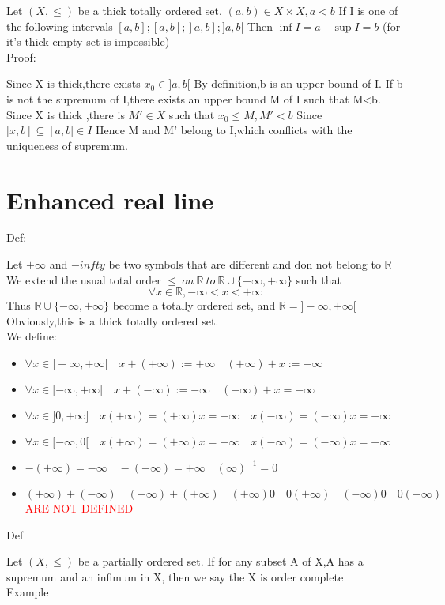 \documentclass{book}
\begin{document}
Let $(X,\leq)$ be a thick totally ordered set. $(a,b)\in X\times X,a<b$ If I is one of the following intervals $[a,b];[a,b[;]a,b];]a,b[$ Then $\inf I=a\quad \sup I=b$ (for it's thick empty set is impossible)\\
Proof:

Since X is thick,there exists $x_0\in]a,b[$ By definition,b is an upper bound of I. If b is not the supremum of I,there exists an upper bound M of I such that M<b. Since X is thick ,there is $M'\in X$ such that $x_0\leq M,M'<b$ Since $[x,b[\subseteq]a,b[\in I$ Hence M and M' belong to I,which conflicts with the uniqueness of supremum.
\chapter{Enhanced real line}
Def:

Let $+\infty$ and $-infty$ be two symbols that are different and don not belong to $\mathbb{R}$ We extend the usual total order $\leq\ on\ \mathbb{R}\ to\ \mathbb{R}\cup\{-\infty,+\infty\}$ such that $$\forall x\in \mathbb{R} ,-\infty<x<+\infty$$ 
\indent Thus $\mathbb{R} \cup\{-\infty,+\infty\}$ become a totally ordered set, and $\mathbb{R} =]-\infty,+\infty[$  Obviously,this is a thick totally ordered set.\\
We define:
\begin{itemize}
    \item $\forall x\in ]-\infty,+\infty]\quad x+(+\infty):=+\infty \quad (+\infty)+x:=+\infty$
    \item $\forall x\in [-\infty,+\infty[\quad x+(-\infty):=-\infty\quad (-\infty)+x=-\infty$
    \item $\forall x\in ]0,+\infty]\quad x(+\infty)=(+\infty)x=+\infty\quad x(-\infty)=(-\infty)x=-\infty$
    \item $\forall x\in [-\infty,0[\quad x(+\infty)=(+\infty)x=-\infty\quad x(-\infty)=(-\infty)x=+\infty$
    \item $-(+\infty)=-\infty\quad -(-\infty)=+\infty\quad (\infty)^{-1}=0$
    \item $(+\infty)+(-\infty)\quad (-\infty)+(+\infty)\quad (+\infty)0\quad 0(+\infty)\quad(-\infty)0\quad 0(-\infty)$ \\\textcolor{red}{ARE NOT DEFINED}
\end{itemize}
Def 

Let $(X,\leq)$ be a partially ordered set. If for any subset A of X,A has a supremum and an infimum in X, then we say the X is order complete\\
Example
\end{document}
